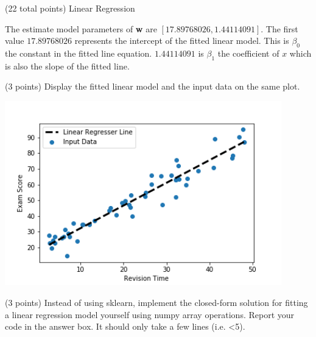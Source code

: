 \documentclass[12pt]{article}
\begin{document}
\begin{question}{(22 total points) Linear Regression}
\begin{subquestion}
\begin{answerbox}{10em}
The estimate model parameters of \textbf{w} are $[17.89768026,  1.44114091]$. The first value $17.89768026$ represents the intercept of the fitted linear model. This is $\beta_{0}$ the constant in the fitted line equation. $1.44114091$ is $\beta_{1}$ the coefficient of $x$ which is also the slope of the fitted line.
\end{answerbox}



\end{subquestion}



%
%
\begin{subquestion}{(3 points) Display the fitted linear model and the input data on the same plot.
}


\begin{answerbox}{35em}
\begin{center}
\includegraphics[width=0.9\textwidth]{results/lin-reg-pred-vs-input.png}
\end{center}
\end{answerbox}



\end{subquestion}



%
%
\begin{subquestion}{(3 points) Instead of using sklearn, implement the closed-form solution for fitting a linear regression model yourself using numpy array operations.  
Report your code in the answer box.
It should only take a few lines (i.e. <5).\\ 
}



\end{subquestion}
\end{question}
\end{document}
